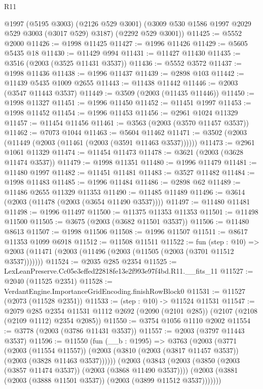 \begin{lexlean}{R11}
\begin{coremodule}
      @1997
      (@5195 @3003)
      (@2126 @529 @3001)
      (@3009 @530 @1586 @1997 @2029 @529 @3003 (@3017 @529) @3187)
      (@2292 @529 @3001))
@11425 := @5552 @2000
@11426 := @1998 @11425
@11427 := @1996 @11426
@11429 := @5605 @5435 @18
@11430 := @11429 @994
@11431 := @11427 @11430
@11435 := @3516 (@2003 (@3525 @11431 @3537))
@11436 := @5552 @3572
@11437 := @1998 @11436
@11438 := @1996 @11437
@11439 := @2898 @103
@11442 := @11439 @5435 @1009 @2655
@11443 := @11438 @11442
@11446 := @2003 (@3547 @11443 @3537)
@11449 := @3509 (@2003 (@11435 @11446))
@11450 := @1998 @11327
@11451 := @1996 @11450
@11452 := @11451 @1997
@11453 := @1998 @11452
@11454 := @1996 @11453
@11456 := @2961 @1024 @11329
@11457 := @11454 @11456
@11461 := @3563 (@2003 (@3570 @11457 @3537))
@11462 := @7073 @1044
@11463 := @5604 @11462
@11471 := @3502 (@2003 (@11449 (@2003 (@11461 (@2003 (@3591 @11463 @3537))))))
@11473 := @2961 @1061 @11329
@11474 := @11454 @11473
@11478 := @3621 (@2003 (@3628 @11474 @3537))
@11479 := @1998 @11351
@11480 := @1996 @11479
@11481 := @11480 @1997
@11482 := @11451 @11481
@11483 := @3527 @11482
@11484 := @1998 @11483
@11485 := @1996 @11484
@11486 := @2898 @62
@11489 := @11486 @2655 @11329 @11353
@11490 := @11485 @11489
@11496 := @3614 (@2003 (@11478 (@2003 (@3654 @11490 @3537))))
@11497 := @11480 @11481
@11498 := @1996 @11497
@11500 := @11375 @11353 @11353
@11501 := @11498 @11500
@11505 := @3675 (@2003 (@3682 @11501 @3537))
@11506 := @11480 @8613
@11507 := @1998 @11506
@11508 := @1996 @11507
@11511 := @8617 @11353 @1099 @6918
@11512 := @11508 @11511
@11522 := fun (step : @10) =>
  @2003 (@11471 (@2003 (@11496 (@2003 (@11505 (@2003 (@3701 @11512 @3537)))))))
@11524 := @2035 @285 @2354
@11525 := LexLeanPreserve.Cc05e3effed22818fe13e2f993e97f4bd.R11.__fits_11
@11527 := @2040 (@11525 @2351)
@11528 := VerdantEngine.ImportanceGridEncoding.finishRowBlock0
@11531 := @11527 (@2073 (@11528 @2351))
@11533 := (step : @10) -> @11524 @11531
@11547 := @2079
    @285
    @2354
    @11531
    @1112
    @2692
    (@2090 (@2101 @285))
    (@2107 (@2108 (@2109 @1112) @2354 @2085))
@11550 := @3754 @1056 @1110 @2002
@11554 := @3778 (@2003 (@3786 @11431 @3537))
@11557 := @2003 (@3797 @11443 @3537)
@11596 := @11550
    (fun (__b : @1995) =>
    @3763
      (@2003
        (@3771
          (@2003 (@11554 @11557))
          (@2003 (@3810 (@2003 (@3817 @11457 @3537)) (@2003 (@3828 @11463 @3537))))))
      (@2003
        (@3843
          (@2003 (@3850 (@2003 (@3857 @11474 @3537)) (@2003 (@3868 @11490 @3537))))
          (@2003 (@3881 (@2003 (@3888 @11501 @3537)) (@2003 (@3899 @11512 @3537)))))))

\end{coremodule}
\end{lexlean}
